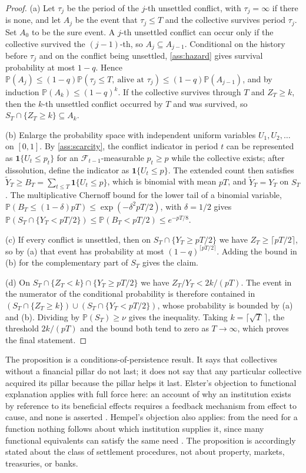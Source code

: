 \documentclass[11pt,letterpaper]{article}
\theoremstyle{definition}
\theoremstyle{remark}
\newcommand{\Prob}{\mathbb{P}}
\begin{document}
\begin{proof}
(a) Let $\tau_j$ be the period of the $j$-th unsettled conflict, with $\tau_j=\infty$ if there is none, and let $A_j$ be the event that $\tau_j\leq T$ and the collective survives period $\tau_j$. Set $A_0$ to be the sure event. A $j$-th unsettled conflict can occur only if the collective survived the $(j-1)$-th, so $A_j\subseteq A_{j-1}$. Conditional on the history before $\tau_j$ and on the conflict being unsettled, \cref{ass:hazard} gives survival probability at most $1-q$. Hence $\Prob(A_j)\leq(1-q)\Prob(\tau_j\leq T,\ \text{alive at }\tau_j)\leq(1-q)\Prob(A_{j-1})$, and by induction $\Prob(A_k)\leq(1-q)^k$. If the collective survives through $T$ and $Z_T\geq k$, then the $k$-th unsettled conflict occurred by $T$ and was survived, so $S_T\cap\{Z_T\geq k\}\subseteq A_k$.

(b) Enlarge the probability space with independent uniform variables $U_1,U_2,\dots$ on $[0,1]$. By \cref{ass:scarcity}, the conflict indicator in period $t$ can be represented as $\mathbf{1}\{U_t\leq p_t\}$ for an $\mathcal{F}_{t-1}$-measurable $p_t\geq p$ while the collective exists; after dissolution, define the indicator as $\mathbf{1}\{U_t\leq p\}$. The extended count then satisfies $\tilde Y_T\geq B_T=\sum_{t\leq T}\mathbf{1}\{U_t\leq p\}$, which is binomial with mean $pT$, and $\tilde Y_T=Y_T$ on $S_T$. The multiplicative Chernoff bound for the lower tail of a binomial variable, $\Prob(B_T\leq(1-\delta)pT)\leq\exp(-\delta^2pT/2)$, with $\delta=1/2$ gives $\Prob(S_T\cap\{Y_T<pT/2\})\leq\Prob(B_T<pT/2)\leq e^{-pT/8}$.

(c) If every conflict is unsettled, then on $S_T\cap\{Y_T\geq pT/2\}$ we have $Z_T\geq\lceil pT/2\rceil$, so by (a) that event has probability at most $(1-q)^{\lceil pT/2\rceil}$. Adding the bound in (b) for the complementary part of $S_T$ gives the claim.

(d) On $S_T\cap\{Z_T<k\}\cap\{Y_T\geq pT/2\}$ we have $Z_T/Y_T<2k/(pT)$. The event in the numerator of the conditional probability is therefore contained in $(S_T\cap\{Z_T\geq k\})\cup(S_T\cap\{Y_T<pT/2\})$, whose probability is bounded by (a) and (b). Dividing by $\Prob(S_T)\geq\nu$ gives the inequality. Taking $k=\lceil\sqrt T\,\rceil$, the threshold $2k/(pT)$ and the bound both tend to zero as $T\to\infty$, which proves the final statement.
\end{proof}

The proposition is a conditions-of-persistence result. It says that collectives without a financial pillar do not last; it does not say that any particular collective acquired its pillar because the pillar helps it last. Elster's objection to functional explanation applies with full force here: an account of why an institution exists by reference to its beneficial effects requires a feedback mechanism from effect to cause, and none is asserted \citep{elster1983}. Hempel's objection also applies: from the need for a function nothing follows about which institution supplies it, since many functional equivalents can satisfy the same need \citep{hempel1959,merton1968}. The proposition is accordingly stated about the class of settlement procedures, not about property, markets, treasuries, or banks.
\end{document}
